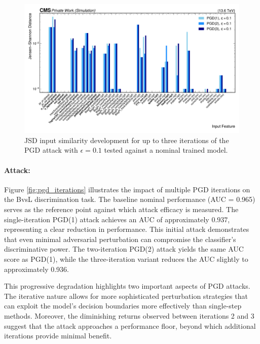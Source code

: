 \begin{figure}[H]
\centering
    \includegraphics[width=15cm]{media/output/features/compare/jsd_pgd_iterations_featurewise_hor.pdf}
    \caption{JSD input similarity development for up to three iterations of the PGD attack with $\epsilon=0.1$ tested against a nominal trained model.}
    \label{fig:pgd_input_overview}
\end{figure}
\FloatBarrier
\newpage
\paragraph{Attack:} Figure \ref{fig:pgd_iterations} illustrates the impact of multiple PGD iterations on the BvsL discrimination task. The baseline nominal performance (AUC = 0.965) serves as the reference point against which attack efficacy is measured. The single-iteration PGD(1) attack achieves an AUC of approximately $0.937$, representing a clear reduction in performance. This initial attack demonstrates that even minimal adversarial perturbation can compromise the classifier's discriminative power. The two-iteration PGD(2) attack yields the same AUC score as PGD(1), while the three-iteration variant  reduces the AUC slightly to approximately 0.936.

This progressive degradation highlights two important aspects of PGD attacks. The iterative nature allows for more sophisticated perturbation strategies that can exploit the model's decision boundaries more effectively than single-step methods. Moreover, the diminishing returns observed between iterations 2 and 3 suggest that the attack approaches a performance floor, beyond which additional iterations provide minimal benefit.

